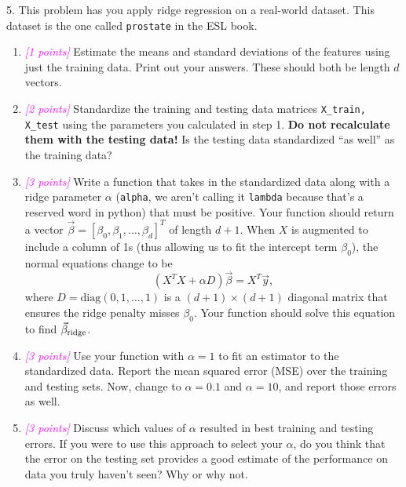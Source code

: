 \documentclass{article}
\newcommand{\points}[1]{\small\textcolor{magenta}{\emph{[#1 points]}} \normalsize}
\begin{document}
5.
This problem has you apply ridge regression on a real-world dataset.
This dataset is the one called {\tt prostate} 
in the ESL book.
\begin{enumerate}
\item \points{1} Estimate the means and standard deviations of the features using just the training data.
  Print out your answers. These should both be length $d$ vectors.
\item \points{2} Standardize the training and testing data matrices {\tt X\_train, X\_test}
  using the parameters you calculated in step 1. {\bf Do not recalculate them with the testing data!}
  Is the testing data standardized ``as well'' as the training data?
\item \points{3} Write a function that takes in the standardized data along with a ridge 
  parameter $\alpha$ ({\tt alpha}, we aren't calling it {\tt lambda} because that's a reserved word in python)
  that must be positive.
  Your function should return a vector $\vec \beta = [\beta_0, \beta_1, \ldots, \beta_d]^T$ of length $d +1$.
  When $X$ is augmented to include a column of 1s (thus allowing us to fit the intercept term $\beta_0$),
  the normal equations change to be
  $$
  (X^T X + \alpha D) \vec \beta = X^T \vec y,
  $$
  where $D = \mathrm{diag}(0, 1, \ldots, 1)$ is a $(d+1) \times (d+1)$ diagonal matrix that ensures
  the ridge penalty misses $\beta_0$.
  Your function should solve this equation to find $\vec \beta_{\rm ridge}$.
\item \points{3}
  Use your function with $\alpha = 1$ to fit an estimator to the standardized data.
  Report the mean squared error (MSE) over the training and testing sets.
  Now, change to $\alpha = 0.1$ and $\alpha=10$, and report those errors as well.
\item \points{3}
  Discuss which values of $\alpha$ resulted in best training and testing errors.
  If you were to use this approach to select your $\alpha$, do you think that
  the error on the testing set provides a good estimate 
  of the performance on data you truly haven't seen?
  Why or why not.
\end{enumerate}
\end{document}
